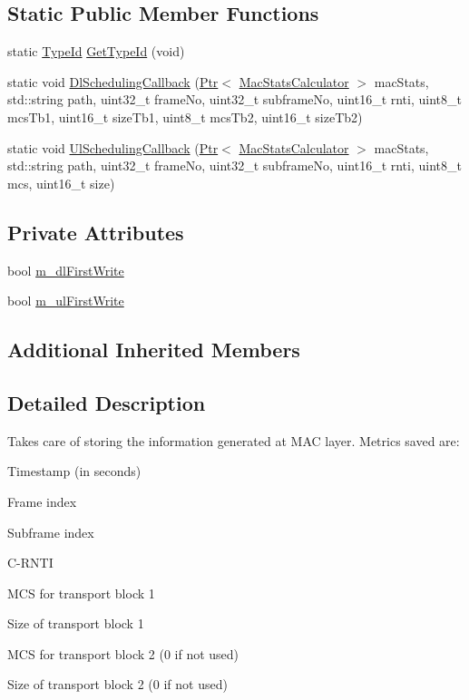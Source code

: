 \subsection*{Static Public Member Functions}
\begin{DoxyCompactItemize}
\item 
static \hyperlink{classns3_1_1TypeId}{Type\+Id} \hyperlink{classns3_1_1MacStatsCalculator_ae1308fec317465b6251beb591a6fb330}{Get\+Type\+Id} (void)
\item 
static void \hyperlink{classns3_1_1MacStatsCalculator_a0be474ae585c5669b37a33a0584e68ab}{Dl\+Scheduling\+Callback} (\hyperlink{classns3_1_1Ptr}{Ptr}$<$ \hyperlink{classns3_1_1MacStatsCalculator}{Mac\+Stats\+Calculator} $>$ mac\+Stats, std\+::string path, uint32\+\_\+t frame\+No, uint32\+\_\+t subframe\+No, uint16\+\_\+t rnti, uint8\+\_\+t mcs\+Tb1, uint16\+\_\+t size\+Tb1, uint8\+\_\+t mcs\+Tb2, uint16\+\_\+t size\+Tb2)
\item 
static void \hyperlink{classns3_1_1MacStatsCalculator_aeb1afcd5f47a1df9d1764f80ea9926d6}{Ul\+Scheduling\+Callback} (\hyperlink{classns3_1_1Ptr}{Ptr}$<$ \hyperlink{classns3_1_1MacStatsCalculator}{Mac\+Stats\+Calculator} $>$ mac\+Stats, std\+::string path, uint32\+\_\+t frame\+No, uint32\+\_\+t subframe\+No, uint16\+\_\+t rnti, uint8\+\_\+t mcs, uint16\+\_\+t size)
\end{DoxyCompactItemize}
\subsection*{Private Attributes}
\begin{DoxyCompactItemize}
\item 
bool \hyperlink{classns3_1_1MacStatsCalculator_a5374491bcea5d56f24be7e9cd0f98e3f}{m\+\_\+dl\+First\+Write}
\item 
bool \hyperlink{classns3_1_1MacStatsCalculator_ade5ada157fabe3969ce7338ae05997ee}{m\+\_\+ul\+First\+Write}
\end{DoxyCompactItemize}
\subsection*{Additional Inherited Members}


\subsection{Detailed Description}
Takes care of storing the information generated at M\+AC layer. Metrics saved are\+:
\begin{DoxyItemize}
\item Timestamp (in seconds)
\item Frame index
\item Subframe index
\item C-\/\+R\+N\+TI
\item M\+CS for transport block 1
\item Size of transport block 1
\item M\+CS for transport block 2 (0 if not used)
\item Size of transport block 2 (0 if not used) 
\end{DoxyItemize}

